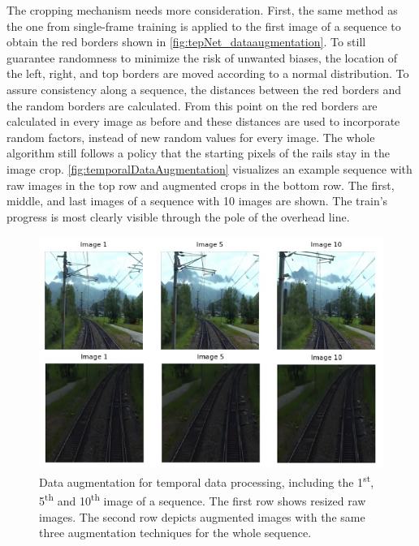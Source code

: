 The cropping mechanism needs more consideration.
First, the same method as the one from single-frame training is applied to the first image of a sequence to obtain the red borders shown in \autoref{fig:tepNet_dataaugmentation}.
To still guarantee randomness to minimize the risk of unwanted biases, the location of the left, right, and top borders are moved according to a normal distribution.
To assure consistency along a sequence, the distances between the red borders and the random borders are calculated.
From this point on the red borders are calculated in every image as before and these distances are used to incorporate random factors, instead of new random values for every image.
The whole algorithm still follows a policy that the starting pixels of the rails stay in the image crop.
\autoref{fig:temporalDataAugmentation} visualizes an example sequence with raw images in the top row and augmented crops in the bottom row.
The first, middle, and last images of a sequence with 10 images are shown.
The train's progress is most clearly visible through the pole of the overhead line. 

\begin{figure}[H]
    \centering
    \includegraphics[width=0.59\linewidth]{PICs//dataAugmentation/temporal_data_augmentation.jpg}
    \caption{Data augmentation for temporal data processing, including the 1\textsuperscript{st}, 5\textsuperscript{th} and 10\textsuperscript{th} image of a sequence. The first row shows resized raw images. The second row depicts augmented images with the same three augmentation techniques for the whole sequence.}
    \label{fig:temporalDataAugmentation}
\end{figure}
